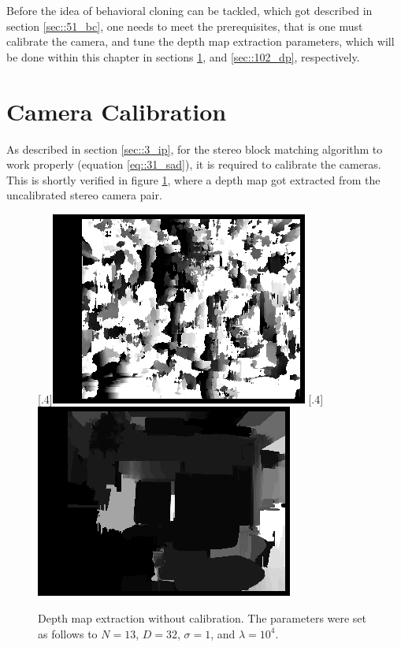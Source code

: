 \FloatBarrier
Before the idea of behavioral cloning can be tackled, which got described in section \ref{sec::51_bc}, one needs to meet the prerequisites, that is one must calibrate the camera, and tune the depth map extraction parameters, which will be done within this chapter in sections \ref{sec::10_cc}, and \ref{sec::102_dp}, respectively.
\section{Camera Calibration}
\label{sec::10_cc}
As described in section \ref{sec::3_ip}, for the stereo block matching algorithm to work properly (equation \ref{eq::31_sad}), it is required to calibrate the cameras. This is shortly verified in figure \ref{fig::101_no_calib}, where a depth map got extracted from the uncalibrated stereo camera pair.
\begin{figure}[h!]
	\centering
	[.4\linewidth]{\includegraphics[scale=.3]{chapters/10_image_processing_experiments/img/disp_no_calib.png}}
	[.4\linewidth]{\includegraphics[scale=.3]{chapters/10_image_processing_experiments/img/wls_no_calib.png}}
	\caption{Depth map extraction without calibration. The parameters were set as follows to $N=13$, $D=32$, $\sigma = 1$, and $\lambda=10^4$.}
	\label{fig::101_no_calib}
\end{figure}
